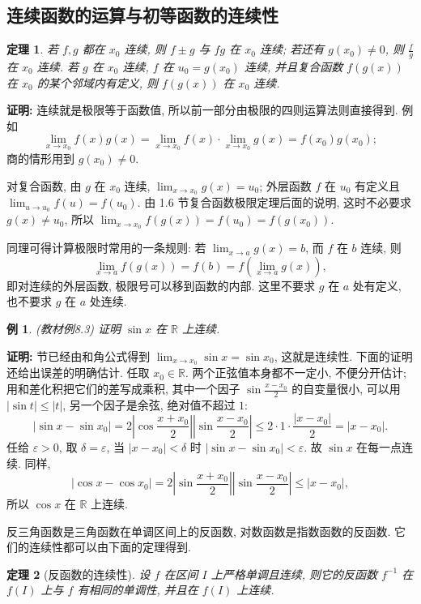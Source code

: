 \documentclass[UTF8,openany]{ctexbook}
\theoremstyle{chinesetextbook}
\newtheorem{example}{例}[section]
\newtheorem{theorem}{定理}[section]
\newenvironment{cnproof}{\par\indent\textbf{证明:} \ignorespaces}{\par}
\begin{document}
\subsection{连续函数的运算与初等函数的连续性}
\begin{theorem}
若 $f,g$ 都在 $x_0$ 连续, 则 $f\pm g$ 与 $fg$ 在 $x_0$ 连续; 若还有 $g(x_0)\ne0$, 则 $\displaystyle\frac fg$ 在 $x_0$ 连续. 若 $g$ 在 $x_0$ 连续, $f$ 在 $u_0=g(x_0)$ 连续, 并且复合函数 $f(g(x))$ 在 $x_0$ 的某个邻域内有定义, 则 $f(g(x))$ 在 $x_0$ 连续.
\end{theorem}
\begin{cnproof}
连续就是极限等于函数值, 所以前一部分由极限的四则运算法则直接得到. 例如
\[
\lim_{x\to x_0}f(x)g(x)=\lim_{x\to x_0}f(x)\cdot\lim_{x\to x_0}g(x)=f(x_0)g(x_0);
\]
商的情形用到 $g(x_0)\ne0$.

对复合函数, 由 $g$ 在 $x_0$ 连续, $\displaystyle\lim_{x\to x_0}g(x)=u_0$; 外层函数 $f$ 在 $u_0$ 有定义且 $\displaystyle\lim_{u\to u_0}f(u)=f(u_0)$. 由 1.6 节复合函数极限定理后面的说明, 这时不必要求 $g(x)\ne u_0$, 所以 $\displaystyle\lim_{x\to x_0}f(g(x))=f(u_0)=f(g(x_0))$.
\end{cnproof}
同理可得计算极限时常用的一条规则: 若 $\displaystyle\lim_{x\to a}g(x)=b$, 而 $f$ 在 $b$ 连续, 则
\[
\lim_{x\to a}f(g(x))=f(b)=f\left(\lim_{x\to a}g(x)\right),
\]
即对连续的外层函数, 极限号可以移到函数的内部. 这里不要求 $g$ 在 $a$ 处有定义, 也不要求 $g$ 在 $a$ 处连续.
\begin{example}\label{ex:8-3}
\textnormal{(教材例8.3)} 证明 $\sin x$ 在 $\mathbb R$ 上连续.
\end{example}
\begin{cnproof}
1.6 节已经由和角公式得到 $\displaystyle\lim_{x\to x_0}\sin x=\sin x_0$, 这就是连续性. 下面的证明还给出误差的明确估计. 任取 $x_0\in\mathbb R$. 两个正弦值本身都不一定小, 不便分开估计; 用和差化积把它们的差写成乘积, 其中一个因子 $\displaystyle\sin\frac{x-x_0}2$ 的自变量很小, 可以用 $|\sin t|\le|t|$, 另一个因子是余弦, 绝对值不超过 $1$:
\[
|\sin x-\sin x_0|=2\left|\cos\frac{x+x_0}2\right|\left|\sin\frac{x-x_0}2\right|\le2\cdot1\cdot\frac{|x-x_0|}2=|x-x_0|.
\]
任给 $\varepsilon>0$, 取 $\delta=\varepsilon$, 当 $|x-x_0|<\delta$ 时 $|\sin x-\sin x_0|<\varepsilon$. 故 $\sin x$ 在每一点连续. 同样,
\[
|\cos x-\cos x_0|=2\left|\sin\frac{x+x_0}2\right|\left|\sin\frac{x-x_0}2\right|\le|x-x_0|,
\]
所以 $\cos x$ 在 $\mathbb R$ 上连续.
\end{cnproof}
反三角函数是三角函数在单调区间上的反函数, 对数函数是指数函数的反函数. 它们的连续性都可以由下面的定理得到.
\begin{theorem}[反函数的连续性]
设 $f$ 在区间 $I$ 上严格单调且连续, 则它的反函数 $f^{-1}$ 在 $f(I)$ 上与 $f$ 有相同的单调性, 并且在 $f(I)$ 上连续.
\end{theorem}
\end{document}
